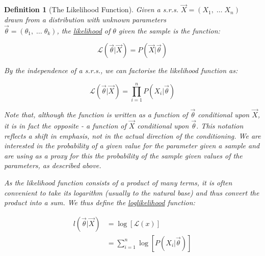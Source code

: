 \documentclass[12pt,a4paper]{article}
\newtheorem{defn}[thm]{Definition}
\begin{document}
\begin{defn}[The Likelihood Function]\vspace{1cm}

Given a s.r.s. $\vec{X} = (X_1,\; \hdots\; X_n)$ drawn from a distribution with unknown parameters \\$\vec{\theta}=(\theta_1,\;\hdots\; \theta_k)$, the \underline{likelihood} of $\theta$ given the sample is the function:

$$\mathcal{L}(\vec{\theta} | \vec{X}) = P(\vec{X} | \vec{\theta})$$

\noindent By the independence of a s.r.s., we can factorise the likelihood function as:

$$\mathcal{L}(\vec{\theta} | \vec{X}) = \prod_{i=1}^n P(X_i | \vec{\theta})$$

Note that, although the function is written as a function of $\vec{\theta}$ conditional upon $\vec{X}$, it is in fact the opposite - a function of $\vec{X}$ conditional upon $\vec{\theta}$. This notation reflects a shift in emphasis, not in the actual direction of the conditioning. We are interested in the probability of a given value for the parameter given a sample and are using as a proxy for this the probability of the sample given values of the parameters, as described above.

As the likelihood function consists of a product of many terms, it is often convenient to take its logarithm (usually to the natural base) and thus convert the product into a sum. We thus define the \underline{loglikelihood} function:

\begin{align*}
l(\vec{\theta} | \vec{X}) &=\log[\mathcal{L}(x)]\\
&= \sum_{i=1}^n \log\left[P\left(X_i | \vec{\theta}\right)\right]
\end{align*}

\end{defn}
\end{document}
